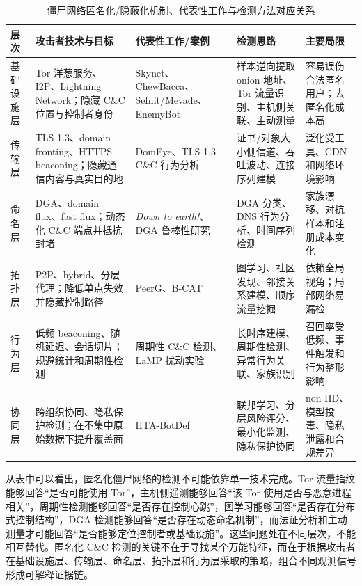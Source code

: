\begin{table}[htbp]
\centering
\scriptsize
\caption{僵尸网络匿名化/隐蔽化机制、代表性工作与检测方法对应关系}
\label{tab:attacker_defender_mapping}
\renewcommand{\arraystretch}{1.25}
\begin{tabular}{@{}p{}p{}p{}p{}p{}@{}}
\hline
\textbf{层次} & \textbf{攻击者技术与目标} & \textbf{代表性工作/案例} & \textbf{检测思路} & \textbf{主要局限} \\
\hline
基础设施层 & Tor 洋葱服务、I2P、Lightning Network；隐藏 C\&C 位置与控制者身份 & Skynet、ChewBacca、Sefnit/Mevade、EnemyBot\cite{rapid7skynet,kaspersky2013chewbacca,torproject2013mevade,fortinet2022enemybot} & 样本逆向提取 onion 地址、Tor 流量识别、主机侧关联、主动测量 & 容易误伤合法匿名用户；去匿名化成本高 \\
\hline
传输层 & TLS 1.3、domain fronting、HTTPS beaconing；隐藏通信内容与真实目的地 & DomEye、TLS 1.3 C\&C 行为分析\cite{xie2024domeye,barradas2024extending} & 证书/对象大小侧信道、吞吐波动、连接序列建模 & 泛化受工具、CDN 和网络环境影响 \\
\hline
命名层 & DGA、domain flux、fast flux；动态化 C\&C 端点并抵抗封堵 & \textit{Down to earth!}、DGA 鲁棒性研究\cite{cebere2024down,drichel2024robust} & DGA 分类、DNS 行为分析、时间序列检测 & 家族漂移、对抗样本和注册成本变化 \\
\hline
拓扑层 & P2P、hybrid、分层代理；降低单点失效并隐藏控制路径 & PeerG、B-CAT\cite{wu2024peerg,putra2024bcat} & 图学习、社区发现、邻接关系建模、顺序流量挖掘 & 依赖全局视角；局部网络易漏检 \\
\hline
行为层 & 低频 beaconing、随机延迟、会话切片；规避统计和周期性检测 & 周期性 C\&C 检测、LaMP 扰动实验\cite{oskera2025periodic,karunanayake2024examining} & 长时序建模、周期性检测、异常行为关联、家族识别 & 召回率受低频、事件触发和行为整形影响 \\
\hline
协同层 & 跨组织协同、隐私保护检测；在不集中原始数据下提升覆盖面 & HTA-BotDef\cite{hossain2025htabotdef} & 联邦学习、分层风险评分、最小化监测、隐私保护协同 & non-IID、模型投毒、隐私泄露和合规差异 \\
\hline
\end{tabular}
\end{table}

从表中可以看出，匿名化僵尸网络的检测不可能依靠单一技术完成。Tor 流量指纹能够回答“是否可能使用 Tor”，主机侧遥测能够回答“该 Tor 使用是否与恶意进程相关”，周期性检测能够回答“是否存在控制心跳”，图学习能够回答“是否存在分布式控制结构”，DGA 检测能够回答“是否存在动态命名机制”，而法证分析和主动测量才可能回答“是否能够定位控制者或基础设施”。这些问题处在不同层次，不能相互替代。匿名化 C\&C 检测的关键不在于寻找某个万能特征，而在于根据攻击者在基础设施层、传输层、命名层、拓扑层和行为层采取的策略，组合不同观测信号形成可解释证据链。

